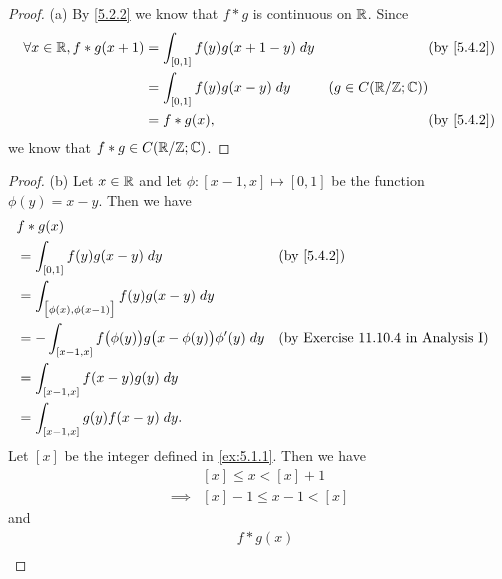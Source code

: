 \begin{proof}{(a)}
  By \cref{5.2.2} we know that \(f * g\) is continuous on \(\mathbb{R}\).
  Since
  \begin{align*}
    \forall x \in \R, f * g(x + 1) & = \int_{[0, 1]} f(y) g(x + 1 - y) \; dy &                         & \by{5.4.2} \\
                                   & = \int_{[0, 1]} f(y) g(x - y) \; dy     & (g \in C(\R / \Z ; \C))              \\
                                   & = f * g(x),                             &                         & \by{5.4.2}
  \end{align*}
  we know that \(f * g \in C(\mathbb{R} / \mathbb{Z} ; \mathbb{C})\).
\end{proof}

\begin{proof}{(b)}
  Let \(x \in \mathbb{R}\) and let \(\phi : [x - 1, x] \mapsto [0, 1]\) be the function \(\phi(y) = x - y\).
  Then we have
  \begin{align*}
     & f * g(x)                                                                                                                      \\
     & = \int_{[0, 1]} f(y) g(x - y) \; dy                                           &  & \by{5.4.2}                                 \\
     & = \int_{\big[\phi(x), \phi(x - 1)\big]} f(y) g(x - y) \; dy                                                                   \\
     & = -\int_{[x - 1, x]} f\big(\phi(y)\big) g\big(x - \phi(y)\big) \phi'(y) \; dy &  & \text{(by Exercise 11.10.4 in Analysis I)} \\
     & = \int_{[x - 1, x]} f(x - y) g(y) \; dy                                                                                       \\
     & = \int_{[x - 1, x]} g(y) f(x - y) \; dy.                                                                                      \\
  \end{align*}
  Let \([x]\) be the integer defined in \cref{ex:5.1.1}.
  Then we have
  \begin{align*}
             & [x] \leq x < [x] + 1     \\
    \implies & [x] - 1 \leq x - 1 < [x]
  \end{align*}
  and
  \begin{align*}
     & f * g(x)                                                                                                                                  \\

\end{align*}
\end{proof}
